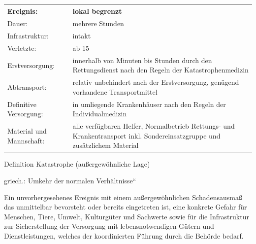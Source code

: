 \documentclass{article}
\begin{document}
\begin{center}
\begin{tabular}{|m{3.31cm}|m{9.99cm}|}
\hline
Ereignis:

 &
lokal begrenzt

\\\hline
Dauer:

 &
mehrere Stunden

\\\hline
Infrastruktur:

 &
intakt

\\\hline
Verletzte:

 &
ab 15

\\\hline
Erstversorgung:

 &
innerhalb von Minuten bis Stunden durch den Rettungsdienst nach den
Regeln der Katastrophenmedizin

\\\hline
Abtransport:

 &
relativ unbehindert nach der Erstversorgung, gen\"ugend vorhandene
Transportmittel

\\\hline
Definitive Versorgung:

 &
in umliegende Krankenh\"auser nach den Regeln der Individualmedizin

\\\hline
Material und Mannschaft:

 &
alle verf\"ugbaren Helfer, Normalbetrieb Rettungs- und Krankentransport
inkl. Sondereinsatzgruppe und zus\"atzlichem Material

\\\hline
\end{tabular}
\end{center}
Definition Katastrophe (au{\ss}ergew\"ohnliche Lage)

griech.:  {\quotedblbase}Umkehr der normalen
Verh\"altnisse{\textquotedblleft} 

Ein unvorhergesehenes Ereignis mit einem au{\ss}ergew\"ohnlichen
Schadensausma{\ss} das unmittelbar bevorsteht oder bereits eingetreten
ist, eine konkrete Gefahr f\"ur Menschen, Tiere, Umwelt, Kulturg\"uter
und Sachwerte sowie f\"ur die Infrastruktur zur Sicherstellung der
Versorgung mit lebensnotwendigen G\"utern und Dienstleistungen, welches
der koordinierten F\"uhrung durch die Beh\"orde bedarf. 
\end{document}
